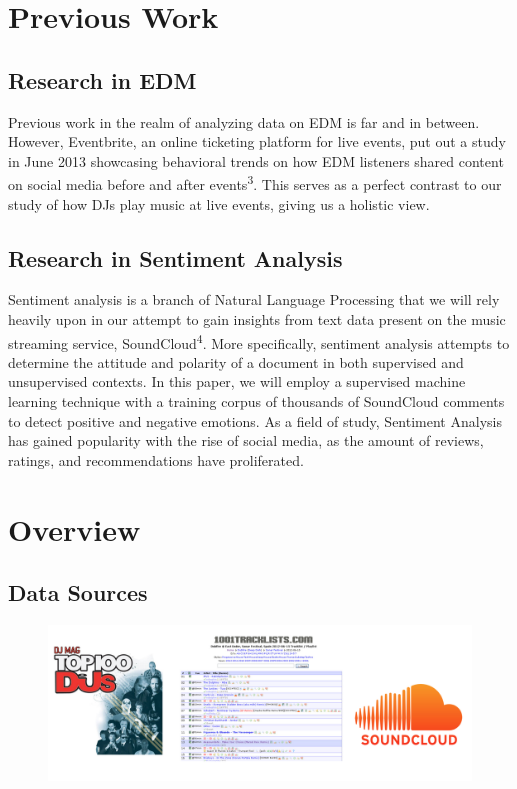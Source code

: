\documentclass[12pt]{dalcsthesis}
\begin{document}
\chapter{Previous Work}

\section{Research in EDM}

Previous work in the realm of analyzing data on EDM is far and in between. However, Eventbrite, an online ticketing platform for live events, put out a study in June 2013 showcasing behavioral trends on how EDM listeners shared content on social media before and after events\textsuperscript{3}. This serves as a perfect contrast to our study of how DJs play music at live events, giving us a holistic view.

\section{Research in Sentiment Analysis}
Sentiment analysis is a branch of Natural Language Processing that we will rely heavily upon in our attempt to gain insights from text data present on the music streaming service, SoundCloud\textsuperscript{4}. More specifically, sentiment analysis attempts to determine the attitude and polarity of a document in both supervised and unsupervised contexts. In this paper, we will employ a supervised machine learning technique with a training corpus of thousands of SoundCloud comments to detect positive and negative emotions. As a field of study, Sentiment Analysis has gained popularity with the rise of social media, as the amount of reviews, ratings, and recommendations have proliferated.

\chapter{Overview}

\section{Data Sources}

\begin{figure}[h]
\includegraphics[scale=.50]{sources}
\centering
\end{figure}
\end{document}
